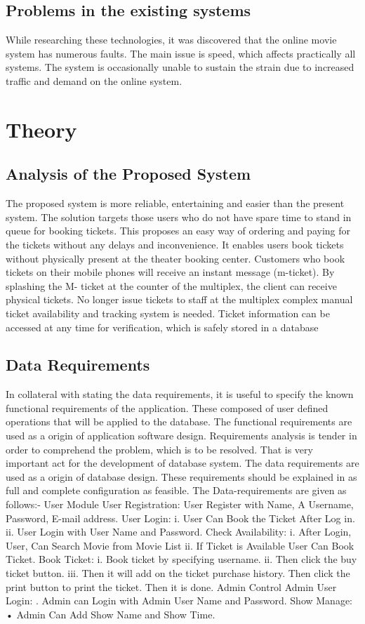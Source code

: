 \documentclass[12pt]{article}
\begin{document}
\subsection{Problems in the existing systems}
While researching these technologies, it was discovered that the online movie system has numerous faults. The main issue is speed, which affects practically all systems. The system is occasionally unable to sustain the strain due to increased traffic and demand on the online system. 
\clearpage

\section{Theory}
\clearpage

\subsection{Analysis of the Proposed System}
The proposed system is more reliable, entertaining and easier than the present system. The solution targets those users who do not have spare time to stand in queue for booking tickets. This proposes an easy way of ordering and paying for the tickets without any delays and inconvenience. It enables users book tickets without physically present at the theater booking center. Customers who book tickets on their mobile phones will receive an instant message (m-ticket). By splashing the M- ticket at the counter of the multiplex, the client can receive physical tickets. No longer issue tickets to staff at the multiplex complex manual ticket availability and tracking system is needed. Ticket information can be accessed at any time for verification, which is safely stored in a database
\subsection{Data Requirements}
In collateral with stating the data requirements, it is useful to specify the known functional requirements of the application. These composed of user defined operations that will be applied to the database. The functional requirements are used as a origin of application software design. Requirements analysis is tender in order to comprehend the problem, which is to be resolved. That is very important act for the development of database system. The data requirements are used as a origin of database design. These requirements should be explained in as full and complete configuration as feasible. The Data-requirements are given as follows:-
User Module
User Registration: User Register with Name, A Username, Password, E-mail address.
User Login: 
i.	User Can Book the Ticket After Log in.
ii.	User Login with User Name and Password.
Check Availability:
i.	After Login, User, Can Search Movie from Movie List
ii.	If Ticket is Available User Can Book Ticket.
Book Ticket:
i.	Book ticket by specifying username.
ii.	Then click the buy ticket button. 
iii.	Then it will add on the ticket purchase history. Then click the print button to print the ticket. Then it is done.
Admin Control
Admin User Login:
.	Admin can Login with Admin User Name and Password.
Show Manage:
•	Admin Can Add Show Name and Show Time.
\end{document}
